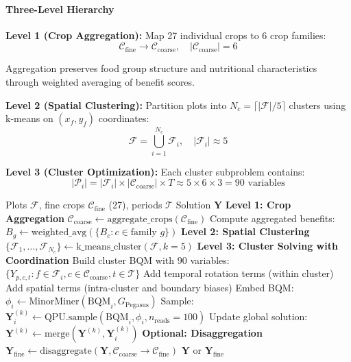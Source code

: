 \documentclass{oqireport}
\begin{document}
\paragraph{Three-Level Hierarchy}

\textbf{Level 1 (Crop Aggregation):} Map 27 individual crops to 6 crop families:
\begin{equation}
\mathcal{C}_{\text{fine}} \rightarrow \mathcal{C}_{\text{coarse}}, \quad |\mathcal{C}_{\text{coarse}}| = 6
\end{equation}

Aggregation preserves food group structure and nutritional characteristics through weighted averaging of benefit scores.

\textbf{Level 2 (Spatial Clustering):} Partition plots into $N_c = \lceil |\mathcal{F}| / 5 \rceil$ clusters using k-means on $(x_f, y_f)$ coordinates:
\begin{equation}
\mathcal{F} = \bigcup_{i=1}^{N_c} \mathcal{F}_i, \quad |\mathcal{F}_i| \approx 5
\end{equation}

\textbf{Level 3 (Cluster Optimization):} Each cluster subproblem contains:
\begin{equation}
|\mathcal{P}_i| = |\mathcal{F}_i| \times |\mathcal{C}_{\text{coarse}}| \times T \approx 5 \times 6 \times 3 = 90 \text{ variables}
\end{equation}

\begin{algorithm}
\caption{Hierarchical Multi-Level Decomposition}
\begin{algorithmic}[1]
\Require Plots $\mathcal{F}$, fine crops $\mathcal{C}_{\text{fine}}$ (27), periods $\mathcal{T}$
\Ensure Solution $\mathbf{Y}$
\State \textbf{Level 1: Crop Aggregation}
\State $\mathcal{C}_{\text{coarse}} \leftarrow \text{aggregate\_crops}(\mathcal{C}_{\text{fine}})$ 
\State Compute aggregated benefits: $B_g \leftarrow \text{weighted\_avg}(\{B_c : c \in \text{family } g\})$
\State \textbf{Level 2: Spatial Clustering}
\State $\{\mathcal{F}_1, \ldots, \mathcal{F}_{N_c}\} \leftarrow \text{k\_means\_cluster}(\mathcal{F}, k=5)$
\State \textbf{Level 3: Cluster Solving with Coordination}
        \State Build cluster BQM with 90 variables: $\{Y_{p,c,t} : f \in \mathcal{F}_i, c \in \mathcal{C}_{\text{coarse}}, t \in \mathcal{T}\}$
        \State Add temporal rotation terms (within cluster)
        \State Add spatial terms (intra-cluster and boundary biases)
        \State Embed BQM: $\phi_i \leftarrow \text{MinorMiner}(\text{BQM}_i, G_{\text{Pegasus}})$
        \State Sample: $\mathbf{Y}_i^{(k)} \leftarrow \text{QPU.sample}(\text{BQM}_i, \phi_i, n_{\text{reads}}=100)$
        \State Update global solution: $\mathbf{Y}^{(k)} \leftarrow \text{merge}(\mathbf{Y}^{(k)}, \mathbf{Y}_i^{(k)})$
    \EndFor
\EndFor
\State \textbf{Optional: Disaggregation}
\State $\mathbf{Y}_{\text{fine}} \leftarrow \text{disaggregate}(\mathbf{Y}, \mathcal{C}_{\text{coarse}} \rightarrow \mathcal{C}_{\text{fine}})$
\State \Return $\mathbf{Y}$ or $\mathbf{Y}_{\text{fine}}$
\end{algorithmic}
\end{algorithm}
\end{document}

